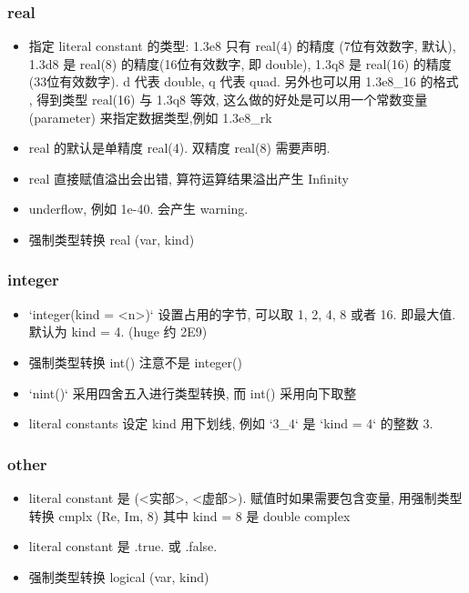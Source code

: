 \subsubsection{real}
\begin{itemize}
\item 指定 literal constant 的类型: 1.3e8 只有 real(4) 的精度 (7位有效数字, 默认), 1.3d8 是 real(8) 的精度(16位有效数字, 即 double), 1.3q8 是 real(16) 的精度(33位有效数字). d 代表 double, q 代表 quad. 另外也可以用 1.3e8_16 的格式 , 得到类型  real(16) 与 1.3q8 等效, 这么做的好处是可以用一个常数变量 (parameter) 来指定数据类型,例如 1.3e8_rk 
\item real 的默认是单精度 real(4). 双精度 real(8) 需要声明.
\item real 直接赋值溢出会出错, 算符运算结果溢出产生 Infinity
\item underflow, 例如 1e-40. 会产生 warning.
\item 强制类型转换 real (var, kind)
\end{itemize}

\subsubsection{integer}
\begin{itemize}
\item `integer(kind = <n>)` 设置占用的字节, 可以取 1, 2, 4, 8 或者 16. 即最大值. 默认为 
   kind = 4. (huge 约 2E9)
\item 强制类型转换 int() 注意不是 integer()
\item `nint()` 采用四舍五入进行类型转换, 而 int() 采用向下取整
\item literal constants 设定 kind 用下划线, 例如 `3_4` 是 `kind = 4` 的整数 3.
\end{itemize}

\subsubsection{other}
\begin{itemize}
\item literal constant 是 (<实部>, <虚部>). 赋值时如果需要包含变量, 用强制类型转换 cmplx (Re, Im, 8) 其中 kind = 8 是 double complex
\item literal constant 是 .true. 或 .false.
\item 强制类型转换 logical (var, kind)
\end{itemize}

